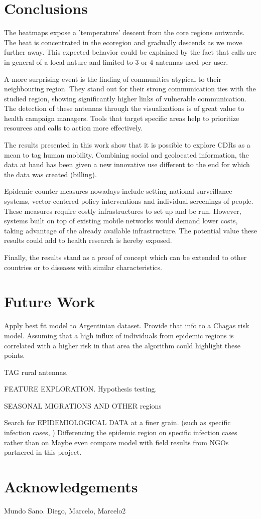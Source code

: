 \section{Conclusions}

The heatmaps expose a 'temperature' descent from the core regions outwards. The heat is concentrated in the ecoregion and gradually descends as we move further away. This expected behavior could be explained by the fact that calls are in general of a local nature and limited to 3 or 4 antennas used per user. 

A more surprising event is the finding of communities atypical to their neighbouring region. They stand out for their strong communication ties with the studied region, showing significantly higher links of vulnerable communication. The detection of these antennas through the visualizations is of great value to health campaign managers. Tools that target specific areas help to prioritize resources and calls to action more effectively.

The results presented in this work show that it is possible to explore CDRs as a mean to tag human mobility. Combining social and geolocated information, the data at hand has been given a new innovative use different to the end for which the data was created (billing).

Epidemic counter-measures nowadays include setting national surveillance systems, vector-centered policy interventions and individual screenings of people. These measures require costly infrastructures to set up and be run. However, systems built on top of existing mobile networks would demand lower costs, taking advantage of the already available infrastructure. The potential value these results could add to health research is hereby exposed.

Finally, the results stand as a proof of concept which can be extended to other countries or to diseases with similar characteristics.

\section{Future Work}
Apply best fit model to Argentinian dataset. Provide that info to a Chagas risk model. Assuming that a high influx of individuals from epidemic regions is correlated with a higher risk in that area the algorithm could highlight these points.

TAG rural antennas.

FEATURE EXPLORATION. Hypothesis testing. 

SEASONAL MIGRATIONS AND OTHER regions

Search for EPIDEMIOLOGICAL DATA at a finer grain. (such as specific infection cases, ) Differencing the epidemic region on specific infection cases rather than on
Maybe even compare model with field results from NGOs partnered in this project.

\section{Acknowledgements}
Mundo Sano. Diego, Marcelo, Marcelo2
